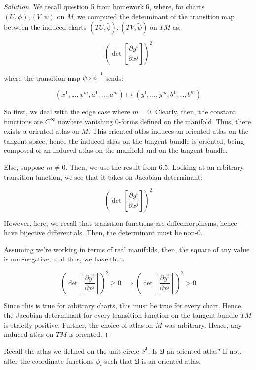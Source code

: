 \documentclass[10pt]{article}
\theoremstyle{nonumberplain}%
\newenvironment{problem}[2][]{\begin{trivlist}
\item[\hskip \labelsep {\bfseries #1}\hskip \labelsep {\bfseries #2.}]}{\end{trivlist}}
\begin{document}
\begin{proof}[Solution]

We recall question 5 from homework 6, where, for charts $(U, \phi), (V, \psi)$ on $M$, we computed the determinant of the transition map between the induced charts $(TU, \tilde{\phi}),(TV, \tilde{\psi})$ on $TM$ as:

$$ \left( \det\left[\frac{\partial y^i}{\partial x^j}\right]\right)^2 $$

where the transition map $\tilde{\psi} \circ \tilde{\phi}^{-1}$ sends:

$$ (x^1,...,x^m, a^1,...,a^m) \mapsto (y^1,...,y^m, b^1,...,b^m)$$

So first, we deal with the edge case where $m = 0$. Clearly, then, the constant functions are $C^\infty$ nowhere vanishing $0$-forms defined on the manifold. Thus, there exists a oriented atlas on $M$. This oriented atlas induces an oriented atlas on the tangent space, hence the induced atlas on the tangent bundle is oriented, being composed of an induced atlas on the manifold and on the tangent bundle.

Else, suppose $m \not = 0$. Then, we use the result from 6.5. Looking at an arbitrary transition function, we see that it takes on Jacobian determinant:

$$  \left( \det\left[\frac{\partial y^i}{\partial x^j}\right]\right)^2 $$

However, here, we recall that transition functions are diffeomorphisms, hence have bijective differentials. Then, the determinant must be non-0.

Assuming we're working in terms of real manifolds, then, the square of any value is non-negative, and thus, we have that:

$$  \left( \det\left[\frac{\partial y^i}{\partial x^j}\right]\right)^2  \geq 0 \implies \left( \det\left[\frac{\partial y^i}{\partial x^j}\right]\right)^2  > 0 $$

Since this is true for arbitrary charts, this must be true for every chart. Hence, the Jacobian determinant for every transition function on the tangent bundle $TM$ is strictly positive. Further, the choice of atlas on $M$ was arbitrary. Hence, any induced atlas on $TM$ is oriented.


\end{proof}

\begin{problem}{Question 3}

Recall the atlas we defined on the unit circle $S^1$. Is $\mathfrak{U}$ an oriented atlas? If not, alter the coordinate functions $\phi_i$ such that $\mathfrak{U}$ is an oriented atlas.

\end{problem}
\end{document}
